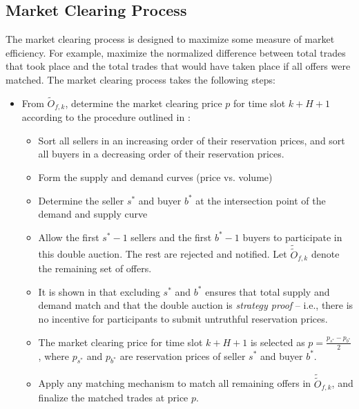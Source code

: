 \subsection{Market Clearing Process}
The market clearing process is designed to maximize some measure of market efficiency. For example, maximize the normalized difference between total trades that took place and the total trades that would have taken place if all offers were matched. 
The market clearing process takes the following steps:
\begin{itemize}
\item From $\tilde{O}_{f,k}$, determine the market clearing price $p$ for time slot $k+H+1$ according to the procedure outlined in \cite{Basar14}:
\begin{itemize}
\item Sort all sellers in an increasing order of their reservation prices, and sort all buyers in a decreasing order of their reservation prices. 
\item Form the supply and demand curves (price vs. volume)
\item Determine the seller $s^*$ and buyer $b^*$ at the intersection point of the demand and supply curve
\item Allow the first $s^*-1$ sellers and the first $b^*-1$ buyers to participate in this double auction. The rest are rejected and notified. Let $\tilde{\tilde{O}}_{f,k}$ denote the remaining set of offers. 
\item It is shown in \cite{Emarket} that excluding $s^*$ and $b^*$ ensures that total supply and demand match and that the double auction is \emph{strategy proof} -- i.e., there is no incentive for participants to submit untruthful reservation prices. 
\item The market clearing price for time slot $k+H+1$ is selected as $p=\tfrac{p_{s^*} - p_{b^*}}{2}$, where $p_{s^*}$ and $p_{b^*}$ are reservation prices of seller $s^*$ and buyer $b^*$. 
\item Apply any matching mechanism to match all remaining offers in $\tilde{\tilde{O}}_{f,k}$, and finalize the matched trades at price $p$.
\end{itemize}
\end{itemize}

